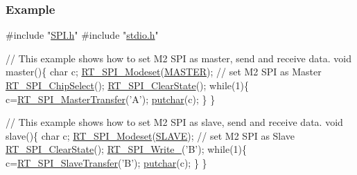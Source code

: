 \subsubsection*{Example}


\begin{DoxyCode}
\textcolor{preprocessor}{#include "\mbox{\hyperlink{a00086}{SPI.h}}"}
\textcolor{preprocessor}{#include "\mbox{\hyperlink{a00095}{stdio.h}}"}

\textcolor{comment}{// This example shows how to set M2 SPI as master, send and receive data.}
\textcolor{keywordtype}{void} master()\{
    \textcolor{keywordtype}{char} c;
    \mbox{\hyperlink{a00086_aaa4fe1ff7cdd82bb01d0e9c8b78f1c4e}{RT\_SPI\_Modeset}}(\mbox{\hyperlink{a00086_a3fa2d3bf1901157f734a584d47b25d8b}{MASTER}});             \textcolor{comment}{// set M2 SPI as Master}
    \mbox{\hyperlink{a00086_ab5011f13ab02a1c07b52047efb930cae}{RT\_SPI\_ChipSelect}}();
    \mbox{\hyperlink{a00086_a58a483e605dad12bcb7cb0c72645a391}{RT\_SPI\_ClearState}}();
    \textcolor{keywordflow}{while}(1)\{
        c=\mbox{\hyperlink{a00083_a61938c7db10cdb7d7281c7c796526b59}{RT\_SPI\_MasterTransfer}}(\textcolor{charliteral}{'A'});
        \mbox{\hyperlink{a00095_a948b7a0779c308ac5502c57e282e6933}{putchar}}(c);
    \}
\}

\textcolor{comment}{// This example shows how to set M2 SPI as slave, send and receive data.}
\textcolor{keywordtype}{void} slave()\{
    \textcolor{keywordtype}{char} c;
    \mbox{\hyperlink{a00086_aaa4fe1ff7cdd82bb01d0e9c8b78f1c4e}{RT\_SPI\_Modeset}}(\mbox{\hyperlink{a00086_ae342da5a4630c191c1c983958808edd8}{SLAVE}});              \textcolor{comment}{// set M2 SPI as Slave}
    \mbox{\hyperlink{a00086_a58a483e605dad12bcb7cb0c72645a391}{RT\_SPI\_ClearState}}();
    \mbox{\hyperlink{a00086_a38a5e77ba10f0d47cf17a5e9865051a7}{RT\_SPI\_Write\_}}(\textcolor{charliteral}{'B'});
    \textcolor{keywordflow}{while}(1)\{
        c=\mbox{\hyperlink{a00083_a86a904500b912f32af83058779a01251}{RT\_SPI\_SlaveTransfer}}(\textcolor{charliteral}{'B'});
        \mbox{\hyperlink{a00095_a948b7a0779c308ac5502c57e282e6933}{putchar}}(c);
    \}
\}
\end{DoxyCode}
 
